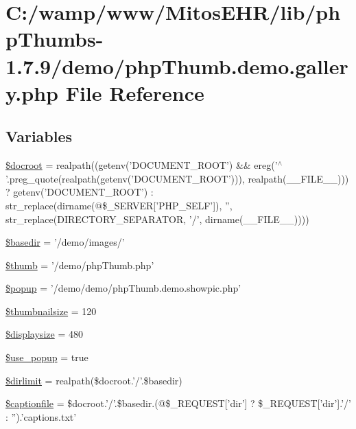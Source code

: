\hypertarget{php_thumb_8demo_8gallery_8php}{\section{\-C\-:/wamp/www/\-Mitos\-E\-H\-R/lib/php\-Thumbs-\/1.7.9/demo/php\-Thumb.demo.\-gallery.\-php \-File \-Reference}
\label{php_thumb_8demo_8gallery_8php}
}
\subsection*{\-Variables}
\begin{DoxyCompactItemize}
\item 
\hyperlink{php_thumb_8demo_8gallery_8php_a4871a20ac1575ecfd9b966eb667f713b}{\$docroot} = realpath((getenv('\-D\-O\-C\-U\-M\-E\-N\-T\-\_\-\-R\-O\-O\-T') \&\& ereg('$^\wedge$'.preg\-\_\-quote(realpath(getenv('\-D\-O\-C\-U\-M\-E\-N\-T\-\_\-\-R\-O\-O\-T'))), realpath(\-\_\-\-\_\-\-F\-I\-L\-E\-\_\-\-\_\-))) ? getenv('\-D\-O\-C\-U\-M\-E\-N\-T\-\_\-\-R\-O\-O\-T') \-: str\-\_\-replace(dirname(@\$\-\_\-\-S\-E\-R\-V\-E\-R\mbox{[}'\-P\-H\-P\-\_\-\-S\-E\-L\-F'\mbox{]}), '', str\-\_\-replace(\-D\-I\-R\-E\-C\-T\-O\-R\-Y\-\_\-\-S\-E\-P\-A\-R\-A\-T\-O\-R, '/', dirname(\-\_\-\-\_\-\-F\-I\-L\-E\-\_\-\-\_\-))))
\item 
\hyperlink{php_thumb_8demo_8gallery_8php_aaa31838e86513cb3a51e398894ee4b35}{\$basedir} = '/demo/images/'
\item 
\hyperlink{php_thumb_8demo_8gallery_8php_a49f22ef470a5fd63b3e4c5dd98f42ca5}{\$thumb} = '/demo/php\-Thumb.\-php'
\item 
\hyperlink{php_thumb_8demo_8gallery_8php_ad0d5f37ae88e4439e6c1391b08ca9785}{\$popup} = '/demo/demo/php\-Thumb.\-demo.\-showpic.\-php'
\item 
\hyperlink{php_thumb_8demo_8gallery_8php_aac5bfce0be309364b2e712c47989e106}{\$thumbnailsize} = 120
\item 
\hyperlink{php_thumb_8demo_8gallery_8php_ab940018ec6099d0ef2fc17e08485d308}{\$displaysize} = 480
\item 
\hyperlink{php_thumb_8demo_8gallery_8php_adb6effb867173540d2cd3cfc84ec740e}{\$use\-\_\-popup} = true
\item 
\hyperlink{php_thumb_8demo_8gallery_8php_a1ae50c67691763d28241517c6b341750}{\$dirlimit} = realpath(\$docroot.'/'.\$basedir)
\item 
\hyperlink{php_thumb_8demo_8gallery_8php_a3402a0328e5ea40b6729476ebe3edbc8}{\$captionfile} = \$docroot.'/'.\$basedir.(@\$\-\_\-\-R\-E\-Q\-U\-E\-S\-T\mbox{[}'dir'\mbox{]} ? \$\-\_\-\-R\-E\-Q\-U\-E\-S\-T\mbox{[}'dir'\mbox{]}.'/' \-: '').'captions.\-txt'
\end{DoxyCompactItemize}


